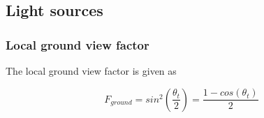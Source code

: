 \subsection{Light sources}

\subsubsection{Local ground view factor}
The local ground view factor is given as \cite{neryterrain}

\begin{equation}
F_{ground}=sin^2 \left ( \frac{\theta_t}{2}\right )=\frac{1-cos(\theta_t)}{2}
\end{equation}

